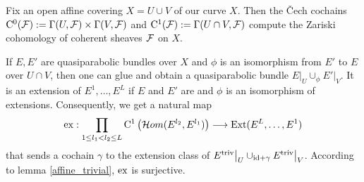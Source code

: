 \documentclass{article}
\begin{document}
Fix an open affine covering $X = U \cup V$ of our curve $X$. Then the \v{C}ech cochains $\mathrm{C}^0(\mathcal{F}) := \Gamma(U, \mathcal{F}) \times \Gamma(V, \mathcal{F})$ and
$\mathrm{C}^1(\mathcal{F}) := \Gamma( U \cap V, \mathcal{F})$ compute the Zariski cohomology of coherent sheaves $\mathcal{F}$ on $X$.

If $E,E'$ are quasiparabolic bundles over $X$ and $\phi$ is an isomorphism from $E'$ to $E$ over $U \cap V$, then one can glue and obtain a quasiparabolic
bundle $E \big|_U \cup_{\phi} E' \big|_V$. It is an extension of $E^1, \ldots, E^L$ if $E$ and $E'$ are and $\phi$ is an isomorphism of extensions.
Consequently, we get a natural map
\begin{displaymath}
  \mathrm{ex}: \displaystyle \prod_{1 \leq l_1 < l_2 \leq L} \mathrm{C}^1 \left( \mathcal{H}om(E^{l_2}, E^{l_1}) \right) \stackrel{}{\longrightarrow} \mathrm{Ext}( E^L, \ldots, E^1)
\end{displaymath}
that sends a cochain $\gamma$ to the extension class of $E^{\mathrm{triv}} \big|_U \cup_{\mathrm{id} + \gamma} E^{\mathrm{triv}} \big|_V$. According to lemma
\ref{affine_trivial}, $\mathrm{ex}$ is surjective.
\end{document}
